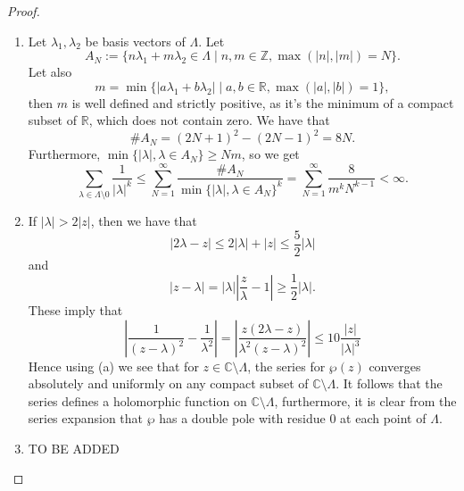 \documentclass{article}
\theoremstyle{definition}
\theoremstyle{remark}
\newcommand{\C}{\mathbb{C}}
\newcommand{\R}{\mathbb{R}}
\newcommand{\Z}{\mathbb{Z}}
\begin{document}
\begin{proof}
	\begin{enumerate}[label=(\alph*)]
	\item	Let $\lambda_1, \lambda_2$ be basis vectors of $\Lambda$.
		Let 
		\begin{equation*}
			A_N := \{n\lambda_1 + m\lambda_2 \in \Lambda \mid
			n, m \in \Z, \max(|n|, |m|) = N\}.
		\end{equation*}
		Let also 
		\begin{equation*}
			m = \min\{|a\lambda_1 + b\lambda_2| \mid 
			a, b \in \R, \max(|a|,|b|) = 1\},
		\end{equation*}
		then $m$ is well defined and strictly positive,
		as it's the minimum of a compact subset of $\R$, which does
		not contain zero. We have that
		\begin{equation*}
			\#A_N = (2N + 1)^2 - (2N - 1)^2 = 8N.
		\end{equation*}
		Furthermore, $\min\{|\lambda|, \lambda \in A_N\} \geq Nm$, so we
		get
		\begin{equation*}
			\sum_{\lambda \in \Lambda\setminus 0}\frac{1}{|\lambda|^k}
			\leq \sum_{N=1}^\infty \frac{\#A_N}{\min\{|\lambda|, \lambda \in
			A_N\}^k}
			= \sum_{N=1}^{\infty} \frac{8}{m^kN^{k-1}} < \infty.
		\end{equation*}
	\item
		If $|\lambda| > 2|z|$, then we have that
		\begin{equation*}
			|2\lambda - z| \leq 2|\lambda| + |z| \leq \frac{5}{2}|\lambda|
		\end{equation*}
		and
		\begin{equation*}
			|z - \lambda| = |\lambda|\left|\frac{z}{\lambda} - 1\right| \geq
			\frac{1}{2}|\lambda|.
		\end{equation*}
		These imply that
		\begin{equation*}
			\left| \frac{1}{(z - \lambda)^2} - \frac{1}{\lambda^2}\right|
			= \left| \frac{z(2\lambda - z)}{\lambda^2(z - \lambda)^2}\right|
			\leq 10\frac{|z|}{|\lambda|^3}
		\end{equation*}
		Hence using (a) we see that for $z \in \C \setminus \Lambda$,
		the series for $\wp(z)$ converges absolutely and uniformly on any 
		compact subset of $\C \setminus \Lambda$. It follows that
		the series defines a holomorphic function on $\C \setminus \Lambda$,
		furthermore, it is clear from the series expansion that $\wp$ has
		a double pole with residue $0$ at each point of $\Lambda$.
	\item TO BE ADDED
	\end{enumerate}
\end{proof}
\end{document}
